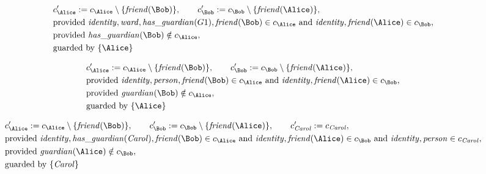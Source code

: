 \begin{align*}
&
c'_
{
\Alice
}
 := 
c_
{
\Alice
}
 \setminus 
\{
\mathit{\detokenize{
friend
}}
(
\Bob
)
\}
, \qquad 
c'_
{
\Bob
}
 := 
c_
{
\Bob
}
 \setminus 
\{
\mathit{\detokenize{
friend
}}
(
\Alice
)
\}
,\\
&
\text{provided } 
\mathit{\detokenize{
identity
}}
,
\mathit{\detokenize{
ward
}}
,
\mathit{\detokenize{
has_guardian
}}
(
G1
)
,
\mathit{\detokenize{
friend
}}
(
\Bob
)
 \in c_
{
\Alice
}
 \text{ and } 
\mathit{\detokenize{
identity
}}
,
\mathit{\detokenize{
friend
}}
(
\Alice
)
 \in c_
{
\Bob
}
,\\
&
\text{provided } 
\mathit{\detokenize{
has_guardian
}}
(
\Bob
)
 \notin c_
{
\Alice
}
,\\
&
\text{guarded by } \{
\Alice
\}
\end{align*}

\begin{align*}
&
c'_
{
\Alice
}
 := 
c_
{
\Alice
}
 \setminus 
\{
\mathit{\detokenize{
friend
}}
(
\Bob
)
\}
, \qquad 
c'_
{
\Bob
}
 := 
c_
{
\Bob
}
 \setminus 
\{
\mathit{\detokenize{
friend
}}
(
\Alice
)
\}
,\\
&
\text{provided } 
\mathit{\detokenize{
identity
}}
,
\mathit{\detokenize{
person
}}
,
\mathit{\detokenize{
friend
}}
(
\Bob
)
 \in c_
{
\Alice
}
 \text{ and } 
\mathit{\detokenize{
identity
}}
,
\mathit{\detokenize{
friend
}}
(
\Alice
)
 \in c_
{
\Bob
}
,\\
&
\text{provided } 
\mathit{\detokenize{
guardian
}}
(
\Bob
)
 \notin c_
{
\Alice
}
,\\
&
\text{guarded by } \{
\Alice
\}
\end{align*}

\begin{align*}
&
c'_
{
\Alice
}
 := 
c_
{
\Alice
}
 \setminus 
\{
\mathit{\detokenize{
friend
}}
(
\Bob
)
\}
, \qquad 
c'_
{
\Bob
}
 := 
c_
{
\Bob
}
 \setminus 
\{
\mathit{\detokenize{
friend
}}
(
\Alice
)
\}
, \qquad 
c'_
{
\mathit{Carol}
}
 := 
c_
{
\mathit{Carol}
}
,\\
&
\text{provided } 
\mathit{\detokenize{
identity
}}
,
\mathit{\detokenize{
has_guardian
}}
(
\mathit{Carol}
)
,
\mathit{\detokenize{
friend
}}
(
\Bob
)
 \in c_
{
\Alice
}
 \text{ and } 
\mathit{\detokenize{
identity
}}
,
\mathit{\detokenize{
friend
}}
(
\Alice
)
 \in c_
{
\Bob
}
 \text{ and } 
\mathit{\detokenize{
identity
}}
,
\mathit{\detokenize{
person
}}
 \in c_
{
\mathit{Carol}
}
,\\
&
\text{provided } 
\mathit{\detokenize{
guardian
}}
(
\Alice
)
 \notin c_
{
\Bob
}
,\\
&
\text{guarded by } \{
\mathit{Carol}
\}
\end{align*}
